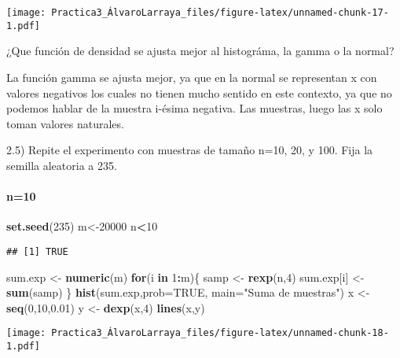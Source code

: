 \documentclass[
]{article}
\newenvironment{Shaded}{\begin{snugshade}}{\end{snugshade}}
\newcommand{\ControlFlowTok}[1]{\textcolor[rgb]{0.13,0.29,0.53}{\textbf{#1}}}
\newcommand{\DataTypeTok}[1]{\textcolor[rgb]{0.13,0.29,0.53}{#1}}
\newcommand{\DecValTok}[1]{\textcolor[rgb]{0.00,0.00,0.81}{#1}}
\newcommand{\FloatTok}[1]{\textcolor[rgb]{0.00,0.00,0.81}{#1}}
\newcommand{\KeywordTok}[1]{\textcolor[rgb]{0.13,0.29,0.53}{\textbf{#1}}}
\newcommand{\NormalTok}[1]{#1}
\newcommand{\OperatorTok}[1]{\textcolor[rgb]{0.81,0.36,0.00}{\textbf{#1}}}
\newcommand{\OtherTok}[1]{\textcolor[rgb]{0.56,0.35,0.01}{#1}}
\newcommand{\StringTok}[1]{\textcolor[rgb]{0.31,0.60,0.02}{#1}}
\begin{document}
\texttt{[image: Practica3\_ÁlvaroLarraya\_files/figure-latex/unnamed-chunk-17-1.pdf]}

¿Que función de densidad se ajusta mejor al histográma, la gamma o la
normal?

La función gamma se ajusta mejor, ya que en la normal se representan x
con valores negativos los cuales no tienen mucho sentido en este
contexto, ya que no podemos hablar de la muestra i-ésima negativa. Las
muestras, luego las x solo toman valores naturales.

2.5) Repite el experimento con muestras de tamaño n=10, 20, y 100. Fija
la semilla aleatoria a 235.

\hypertarget{n10}{%
\paragraph{n=10}\label{n10}}

\begin{Shaded}
\begin{Highlighting}[]
\KeywordTok{set.seed}\NormalTok{(}\DecValTok{235}\NormalTok{)}
\NormalTok{m<-}\DecValTok{20000}
\NormalTok{n}\OperatorTok{<}\DecValTok{10}
\end{Highlighting}
\end{Shaded}

\begin{verbatim}
## [1] TRUE
\end{verbatim}

\begin{Shaded}
\begin{Highlighting}[]
\NormalTok{sum.exp <-}\StringTok{ }\KeywordTok{numeric}\NormalTok{(m)}
\ControlFlowTok{for}\NormalTok{(i }\ControlFlowTok{in} \DecValTok{1}\OperatorTok{:}\NormalTok{m)\{}
\NormalTok{samp <-}\StringTok{ }\KeywordTok{rexp}\NormalTok{(n,}\DecValTok{4}\NormalTok{)}
\NormalTok{sum.exp[i] <-}\StringTok{ }\KeywordTok{sum}\NormalTok{(samp)}
\NormalTok{\}}
\KeywordTok{hist}\NormalTok{(sum.exp,}\DataTypeTok{prob=}\OtherTok{TRUE}\NormalTok{, }\DataTypeTok{main=}\StringTok{"Suma de muestras"}\NormalTok{)}
\NormalTok{x <-}\StringTok{ }\KeywordTok{seq}\NormalTok{(}\DecValTok{0}\NormalTok{,}\DecValTok{10}\NormalTok{,}\FloatTok{0.01}\NormalTok{)}
\NormalTok{y <-}\StringTok{ }\KeywordTok{dexp}\NormalTok{(x,}\DecValTok{4}\NormalTok{)}
\KeywordTok{lines}\NormalTok{(x,y)}
\end{Highlighting}
\end{Shaded}

\texttt{[image: Practica3\_ÁlvaroLarraya\_files/figure-latex/unnamed-chunk-18-1.pdf]}
\end{document}
